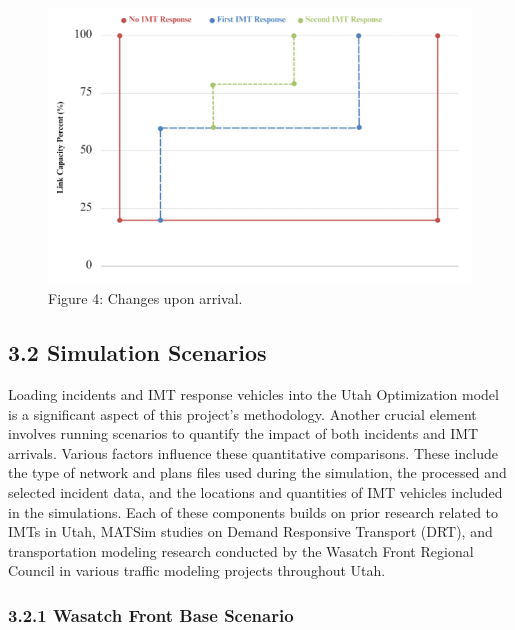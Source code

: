 \documentclass[
  letterpaper,
  DIV=11,
  numbers=noendperiod]{scrreprt}
\begin{document}
\begin{figure}

{\centering \includegraphics{figures/fig4.png}

}

\caption{Figure 4: Changes upon arrival.}

\end{figure}

\hypertarget{simulation-scenarios}{%
\subsection{3.2 Simulation Scenarios}\label{simulation-scenarios}}

Loading incidents and IMT response vehicles into the Utah Optimization
model is a significant aspect of this project's methodology. Another
crucial element involves running scenarios to quantify the impact of
both incidents and IMT arrivals. Various factors influence these
quantitative comparisons. These include the type of network and plans
files used during the simulation, the processed and selected incident
data, and the locations and quantities of IMT vehicles included in the
simulations. Each of these components builds on prior research related
to IMTs in Utah, MATSim studies on Demand Responsive Transport (DRT),
and transportation modeling research conducted by the Wasatch Front
Regional Council in various traffic modeling projects throughout Utah.

\hypertarget{wasatch-front-base-scenario}{%
\subsubsection{3.2.1 Wasatch Front Base
Scenario}\label{wasatch-front-base-scenario}}
\end{document}
